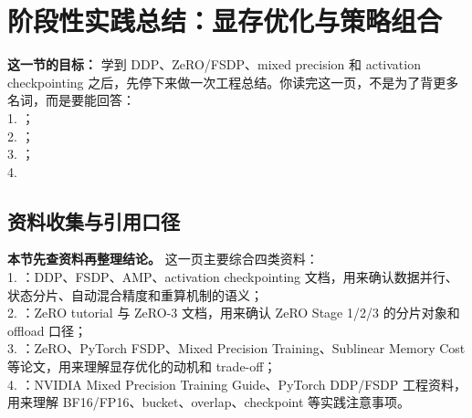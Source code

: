
\section{阶段性实践总结：显存优化与策略组合}

\begin{conceptbox}
\textbf{这一节的目标：} 学到 DDP、ZeRO/FSDP、mixed precision 和 activation checkpointing 之后，先停下来做一次工程总结。你读完这一页，不是为了背更多名词，而是要能回答：\\
1. ；\\
2. ；\\
3. ；\\
4. 
\end{conceptbox}


\subsection*{资料收集与引用口径}

\begin{conceptbox}
\textbf{本节先查资料再整理结论。} 这一页主要综合四类资料：\\
1. ：DDP、FSDP、AMP、activation checkpointing 文档，用来确认数据并行、状态分片、自动混合精度和重算机制的语义；\\
2. ：ZeRO tutorial 与 ZeRO-3 文档，用来确认 ZeRO Stage 1/2/3 的分片对象和 offload 口径；\\
3. ：ZeRO、PyTorch FSDP、Mixed Precision Training、Sublinear Memory Cost 等论文，用来理解显存优化的动机和 trade-off；\\
4. ：NVIDIA Mixed Precision Training Guide、PyTorch DDP/FSDP 工程资料，用来理解 BF16/FP16、bucket、overlap、checkpoint 等实践注意事项。
\end{conceptbox}

